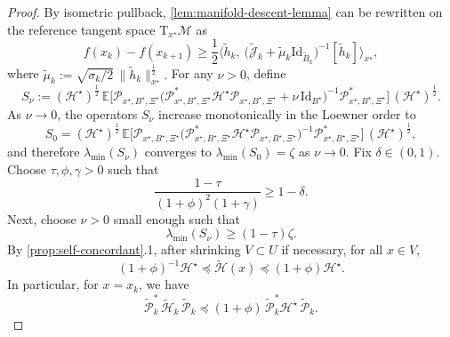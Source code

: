 \documentclass[10pt,a4paper]{amsart}
\begin{document}
\begin{proof}
By isometric pullback, \cref{lem:manifold-descent-lemma} can be rewritten on the reference tangent space $\mathrm{T}_{x^\star}\mathcal{M}$ as
\begin{equation}
f(x_k)-f(x_{k+1})
\ge
\frac{1}{2}
\Big\langle
\widetilde h_k,\
\bigl(\widetilde{\mathcal J}_k+\tilde{\mu}_k\mathrm{Id}_{\widetilde B_k}\bigr)^{-1}[\widetilde h_k]
\Big\rangle_{x^\star},
\label{eq:descent-pulledback}
\end{equation}
where
$
\tilde{\mu}_k
:=
\sqrt{\sigma_k/2}\,\|\widetilde h_k\|_{x^\star}^{\frac{1}{2}}.
$
For any $\nu>0$, define
\[
S_{\nu}
:=
(\mathcal{H}^\star)^{\frac{1}{2}}\,
\mathbb E\Big[
\mathcal P_{x^\star,B^\star,\Xi^\star}
\bigl(
\mathcal P_{x^\star,B^\star,\Xi^\star}^{*}\mathcal{H}^\star\mathcal P_{x^\star,B^\star,\Xi^\star}
+\nu\,\mathrm{Id}_{B^\star}
\bigr)^{-1}
\mathcal P_{x^\star,B^\star,\Xi^\star}^{*}
\Big]\,
(\mathcal{H}^\star)^{\frac{1}{2}}.
\]
As $\nu\to 0$, the operators $S_{\nu}$ increase monotonically in the Loewner order to
\[
S_0
=
(\mathcal{H}^\star)^{\frac{1}{2}}\,
\mathbb E\Big[
\mathcal P_{x^\star,B^\star,\Xi^\star}
\bigl(
\mathcal P_{x^\star,B^\star,\Xi^\star}^{*}\mathcal{H}^\star\mathcal P_{x^\star,B^\star,\Xi^\star}
\bigr)^{-1}
\mathcal P_{x^\star,B^\star,\Xi^\star}^{*}
\Big]\,
(\mathcal{H}^\star)^{\frac{1}{2}},
\]
and therefore $\lambda_{\min}(S_{\nu})$ converges to $\lambda_{\min}(S_0)=\zeta$ as $\nu \to 0$.
Fix $\delta\in(0,1)$. Choose $\tau,\phi,\gamma>0$ such that
\begin{equation}
\frac{1-\tau}{(1+\phi)^2(1+\gamma)}\ge 1-\delta.
\label{eq:local-parameter-choice}
\end{equation}
Next, choose $\nu>0$ small enough such that
\begin{equation}
\lambda_{\min}(S_{\nu})\ge (1-\tau)\zeta.
\label{eq:Smu-close-to-zeta}
\end{equation}
By \cref{prop:self-concordant}.1, after shrinking $V\subset U$ if necessary, for all $x\in V$,
\begin{equation}
(1+\phi)^{-1}\mathcal{H}^\star
\preceq
\widetilde{\mathcal H}(x)
\preceq
(1+\phi)\mathcal{H}^\star.
\label{eq:Hessian-comparison-pulledback}
\end{equation}
In particular, for $x=x_k$, we have
\begin{equation}
\widetilde{\mathcal P}_k^*\,\widetilde{\mathcal H}_k\,\widetilde{\mathcal P}_k
\preceq
(1+\phi)\,\widetilde{\mathcal P}_k^*\mathcal{H}^\star\,\widetilde{\mathcal P}_k.
\label{eq:reduced-Hessian-comparison}
\end{equation}

\end{proof}
\end{document}
